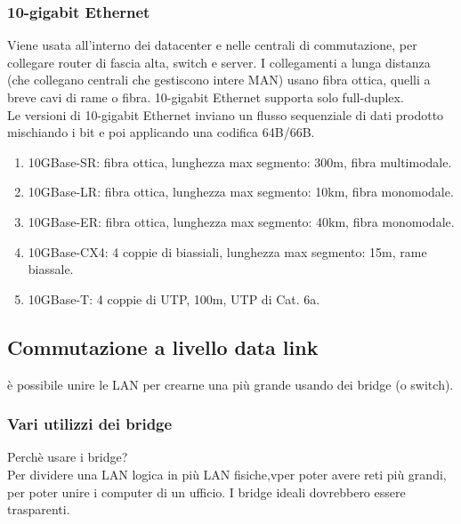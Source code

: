 \documentclass{article}
\begin{document}
{\subsubsection{10-gigabit Ethernet}
Viene usata all'interno dei datacenter e nelle centrali di commutazione, per collegare router di fascia alta, switch e server. I collegamenti a lunga distanza (che collegano centrali che gestiscono intere MAN) usano fibra ottica, quelli a breve cavi di rame o fibra.
10-gigabit Ethernet supporta solo full-duplex. \\
Le versioni di 10-gigabit Ethernet inviano un flusso sequenziale di dati prodotto mischiando i bit e poi applicando una codifica 64B/66B.
\begin{enumerate}
\item 10GBase-SR: fibra ottica, lunghezza max segmento: 300m, fibra multimodale.
\item 10GBase-LR: fibra ottica, lunghezza max segmento: 10km, fibra monomodale.
\item 10GBase-ER: fibra ottica, lunghezza max segmento: 40km, fibra monomodale.
\item 10GBase-CX4: 4 coppie di biassiali, lunghezza max segmento: 15m, rame biassale.
\item 10GBase-T: 4 coppie di UTP, 100m, UTP di Cat. 6a.
\end{enumerate}

\subsection{Commutazione a livello data link}
è possibile unire le LAN per crearne una più grande usando dei bridge (o switch).
\subsubsection{Vari utilizzi dei bridge}
Perchè usare i bridge? \\
Per dividere una LAN logica in più LAN fisiche,vper poter avere reti più grandi, per poter unire i computer di un ufficio.
I bridge ideali dovrebbero essere trasparenti. 
}
\end{document}
